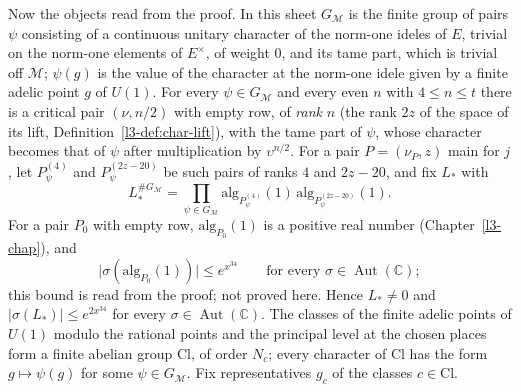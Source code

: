 \documentclass[reqno]{amsart}
\newcounter{chap}
\theoremstyle{definition}
\theoremstyle{plain}
\theoremstyle{remark}
\newcommand{\C}{\mathbb{C}}
\newcommand{\Aut}{\operatorname{Aut}}
\newcommand{\alg}{\mathrm{alg}}
\newcommand{\Cl}{\mathrm{Cl}}
\newcommand{\Gm}{G_{\mathcal M}}
\begin{document}
Now the objects read from the proof.  In this sheet \(\Gm\) is the finite group of pairs \(\psi\) consisting of a continuous unitary character of the norm-one ideles of \(E\), trivial on the norm-one elements of \(E^\times\), of weight \(0\), and its tame part, which is trivial off \(\mathcal M\); \(\psi(g)\) is the value of the character at the norm-one idele given by a finite adelic point \(g\) of \(U(1)\).  For every \(\psi \in \Gm\) and every even \(n\) with \(4 \le n \le t\) there is a critical pair \((\nu, n/2)\) with empty row, of \emph{rank} \(n\) (the rank \(2z\) of the space of its lift, Definition~\ref{l3-def:char-lift}), with the tame part of \(\psi\), whose character becomes that of \(\psi\) after multiplication by \(\upsilon^{n/2}\).  For a pair \(P = (\nu_P, z)\) main for \(j\), let \(P^{(4)}_\psi\) and \(P^{(2z-20)}_\psi\) be such pairs of ranks \(4\) and \(2z - 20\), and fix \(L_*\) with
\[
  L_*^{\#\Gm} = \prod_{\psi \in \Gm}\alg_{P^{(4)}_\psi}(1)\,\alg_{P^{(2z-20)}_\psi}(1) .
\]
For a pair \(P_0\) with empty row, \(\alg_{P_0}(1)\) is a positive real number (Chapter~\ref{l3-chap}), and
\[
  \lvert\sigma(\alg_{P_0}(1))\rvert \le e^{x^{34}} \qquad\text{for every } \sigma \in \Aut(\C) ;
\]
this bound is read from the proof; not proved here.  Hence \(L_* \ne 0\) and \(\lvert\sigma(L_*)\rvert \le e^{2x^{34}}\) for every \(\sigma\in\Aut(\C)\).  The classes of the finite adelic points of \(U(1)\) modulo the rational points and the principal level at the chosen places form a finite abelian group \(\Cl\), of order \(N_c\); every character of \(\Cl\) has the form \(g \mapsto \psi(g)\) for some \(\psi \in \Gm\).  Fix representatives \(g_c\) of the classes \(c \in \Cl\).
\end{document}
